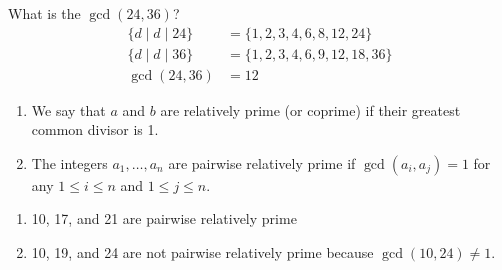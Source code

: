 \documentclass[letterpaper, 12pt]{article}
\newenvironment{definition}[1][Definition]{\begin{trivlist}
\item[\hskip \labelsep {\bfseries #1}]}{\end{trivlist}}
\newenvironment{example}[1][Example]{\begin{trivlist}
\item[\hskip \labelsep {\bfseries #1}]}{\end{trivlist}}
\newcommand{\0}{\emptyset}
\begin{document}
    \begin{example}
        What is the $\gcd(24, 36)$?
        \begin{align*}
            \{d \mid d \mid 24\} &= \{1, 2, 3, 4, 6, 8, 12, 24\} \\
            \{d \mid d \mid 36\} &= \{1, 2, 3, 4, 6, 9, 12, 18, 36\} \\
            \gcd(24, 36) &= 12
        \end{align*}
    \end{example}
    \begin{definition}
        \hfill
        \begin{enumerate}
            \item We say that $a$ and $b$ are relatively prime (or coprime) if their greatest 
            common divisor is 1.
            \item The integers $a_1, \dots, a_n$ are pairwise relatively prime if 
            $\gcd(a_i, a_j) = 1$ for any $1 \le i \le n$ and $1 \le j \le n$.
        \end{enumerate}
    \end{definition}
    \begin{example}
        \begin{enumerate}
            \item 10, 17, and 21 are pairwise relatively prime
            \item 10, 19, and 24 are not pairwise relatively prime because $\gcd(10, 24) \ne 1$.
        \end{enumerate}
    \end{example}
\end{document}
